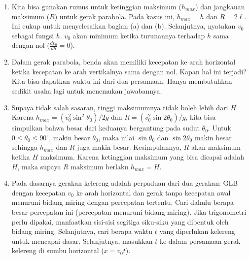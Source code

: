\documentclass[12pt, a4paper]{article}\usepackage[utf8]{inputenc}
\theoremstyle{definition}
\theoremstyle{definition}
\begin{document}
\begin{enumerate}[label=\arabic*]
		\item Kita bisa gunakan rumus untuk ketinggian maksimum ($h_{max}$) dan jangkauan maksimum ($R$) untuk gerak parabola. Pada kasus ini, $h_{max} = h$ dan $R = 2\ell$. Ini cukup untuk menyelesaikan bagian (a) dan (b). Selanjutnya, nyatakan $v_0$ sebagai fungsi $h$. $v_0$ akan minimum ketika turunannya terhadap $h$ sama dengan nol ($\frac{d v_0}{dh} = 0$).
		\item Dalam gerak parabola, benda akan memiliki kecepatan ke arah horizontal ketika kecepatan ke arah vertikalnya sama dengan nol. Kapan hal ini terjadi? Kita bisa dapatkan waktu ini dari dua persamaan. Hanya membutuhkan sedikit usaha lagi untuk menemukan jawabannya.
		\item Supaya tidak salah sasaran, tinggi maksimumnya tidak boleh lebih dari $H$. Karena $h_{max} = (v_0^2 \sin^2 \theta_0)/2g$ dan $R = (v_0^2 \sin 2 \theta_0)/g$, kita bisa simpulkan bahwa besar dari keduanya bergantung pada sudut $\theta_0$. Untuk $0 \leq \theta_0 \leq 90^\circ$, makin besar $\theta_0$, maka nilai $\sin \theta_0$ dan $\sin 2 \theta_0$ makin besar sehingga $h_{max}$ dan $R$ juga makin besar. Kesimpulannya, $R$ akan maksimum ketika $H$ maksimum. Karena ketinggian maksimum yang bisa dicapai adalah $H$, maka supaya $R$ maksimum berlaku $h_{max} = H$.
		\item Pada dasarnya gerakan kelereng adalah perpaduan dari dua gerakan: GLB dengan kecepatan $v_0$ ke arah horizontal dan gerak tanpa kecepatan awal menuruni bidang miring dengan percepatan tertentu. Cari dahulu berapa besar percepatan ini (percepatan menuruni bidang miring). Jika trigonometri perlu dipakai, manfaatkan sisi-sisi segitiga siku-siku yang dibentuk oleh bidang miring. Selanjutnya, cari berapa waktu $t$ yang diperlukan kelereng untuk mencapai dasar. Selanjutnya, masukkan $t$ ke dalam persamaan gerak kelereng di sumbu horizontal ($x = v_0 t$).
	\end{enumerate}
	
\end{document}
